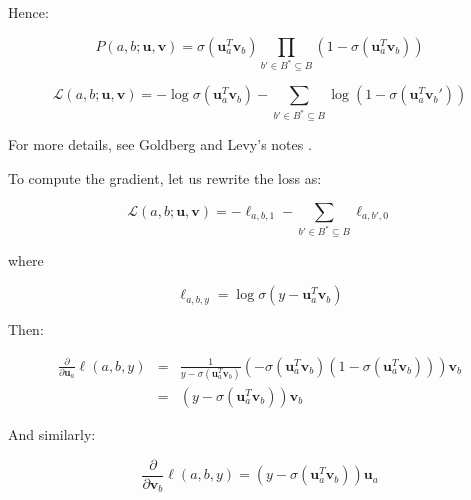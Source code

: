 \documentclass[a4paper,oneside,12pt]{article}
\begin{document}
Hence:

\begin{equation}
P(a, b ; \mathbf{u}, \mathbf{v}) = \sigma \left( \mathbf{u}_a^T \mathbf{v}_b \right) \prod_{b' \in B^* \subseteq B} \left( 1 - \sigma \left( \mathbf{u}_a^T \mathbf{v}_b \right) \right)
\end{equation}

\begin{equation}
\mathcal{L} (a, b ; \mathbf{u}, \mathbf{v}) = -\log \sigma \left( \mathbf{u}_a^T \mathbf{v}_b \right) - \sum_{b' \in B^* \subseteq B} \log \left( 1 - \sigma \left( \mathbf{u}_a^T \mathbf{v}_b' \right) \right)
\end{equation}


For more details, see Goldberg and Levy's notes \cite{Goldberg2014word2vecED}.

To compute the gradient, let us rewrite the loss as:

\begin{equation}
\mathcal{L} (a, b ; \mathbf{u}, \mathbf{v}) = -\ell_{a, b, 1} - \sum_{b' \in B^* \subseteq B} \ell_{a, b', 0}
\end{equation}

where

\begin{equation}
\ell_{a, b, y} = \log \sigma \left( y - \mathbf{u}_a^T \mathbf{v}_b \right)
\end{equation}

Then:

\begin{equation}
\begin{array}{lll}
\frac{\partial}{\partial \mathbf{u}_a} \ell (a, b, y) & = & \frac{1}{y - \sigma \left(\mathbf{u}_a^T \mathbf{v}_b \right)}
\left( - \sigma \left(\mathbf{u}_a^T \mathbf{v}_b \right) \left( 1 - \sigma \left(\mathbf{u}_a^T \mathbf{v}_b \right) \right) \right) \mathbf{v}_b \\
& = & \left( y - \sigma \left(\mathbf{u}_a^T \mathbf{v}_b \right) \right) \mathbf{v}_b
\end{array}
\end{equation}

And similarly:

\begin{equation}
\frac{\partial}{\partial \mathbf{v}_b} \ell (a, b, y) = \left( y - \sigma \left(\mathbf{u}_a^T \mathbf{v}_b \right) \right) \mathbf{u}_a
\end{equation}
\end{document}
